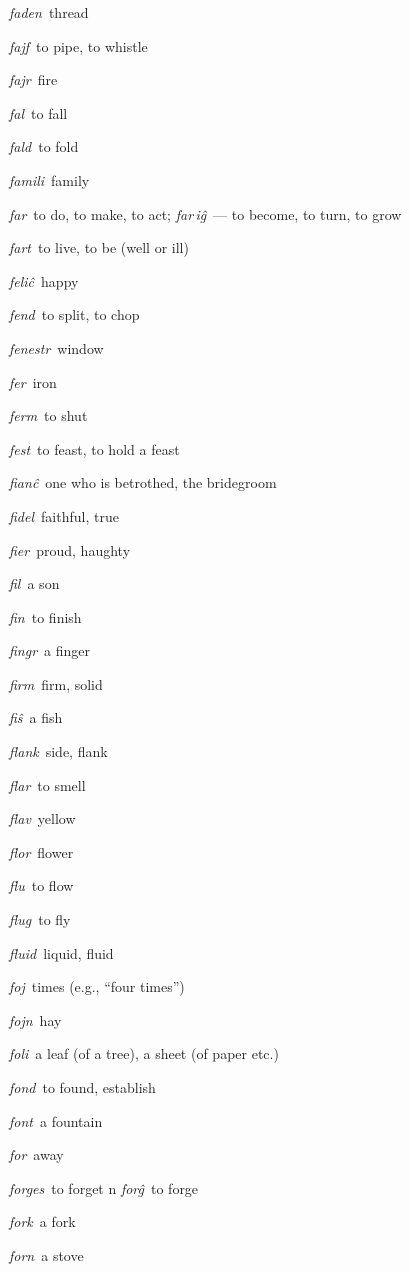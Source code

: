 \begin{landscape}
\begin{multicols}{5}
\begin{outdent}{1em}
\emph{faden\,} thread

\emph{fajf\,} to pipe, to whistle

\emph{fajr\,} fire

\emph{fal\,} to fall

\emph{fald\,} to fold

\emph{famili\,} family

\emph{far\,} to do, to make, to act; \emph{far\,iĝ\,} — to become, to turn, to grow

\emph{fart\,} to live, to be (well or ill)

\emph{feliĉ\,} happy

\emph{fend\,} to split, to chop

\emph{fenestr\,} window

\emph{fer\,} iron

\emph{ferm\,} to shut

\emph{fest\,} to feast, to hold a feast

\emph{fianĉ\,} one who is betrothed, the bridegroom

\emph{fidel\,} faithful, true

\emph{fier\,} proud, haughty

\emph{fil\,} a son

\emph{fin\,} to finish

\emph{fingr\,} a finger

\emph{firm\,} firm, solid

\emph{fiŝ\,} a fish

\emph{flank\,} side, flank

\emph{flar\,} to smell

\emph{flav\,} yellow

\emph{flor\,} flower

\emph{flu\,} to flow

\emph{flug\,} to fly

\emph{fluid\,} liquid, fluid

\emph{foj\,} times (e.g., ``four times'')

\emph{fojn\,} hay

\emph{foli\,} a leaf (of a tree), a sheet (of paper etc.)

\emph{fond\,} to found, establish

\emph{font\,} a fountain

\emph{for\,} away

\emph{forges\,} to forget
n
\emph{forĝ\,} to forge

\emph{fork\,} a fork

\emph{forn\,} a stove


\end{outdent}
\end{multicols}
\end{landscape}
